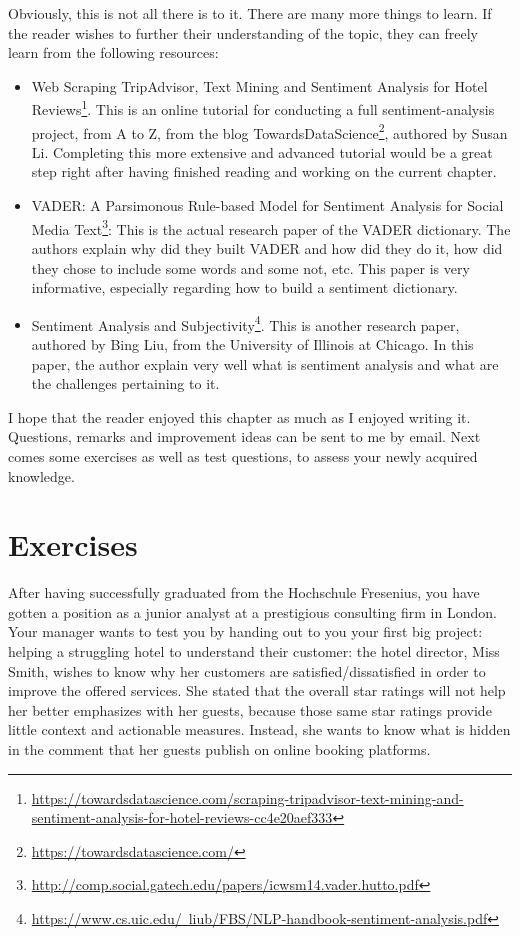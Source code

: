 	Obviously, this is not all there is to it. There are many more things to learn. If the reader wishes to further their understanding of the topic, they can freely learn from the following resources:
	\begin{itemize}
		\item Web Scraping TripAdvisor, Text Mining and Sentiment Analysis for Hotel Reviews\footnote{\href{https://towardsdatascience.com/scraping-tripadvisor-text-mining-and-sentiment-analysis-for-hotel-reviews-cc4e20aef333}{https://towardsdatascience.com/scraping-tripadvisor-text-mining-and-sentiment-analysis-for-hotel-reviews-cc4e20aef333}}. This is an online tutorial for conducting a full sentiment-analysis project, from A to Z, from the blog TowardsDataScience\footnote{\href{https://towardsdatascience.com/}{https://towardsdatascience.com/}}, authored by Susan Li. Completing this more extensive and advanced tutorial would be a great step right after having finished reading and working on the current chapter.
		\item VADER: A Parsimonous Rule-based Model for Sentiment Analysis for Social Media Text\footnote{\href{http://comp.social.gatech.edu/papers/icwsm14.vader.hutto.pdf}{http://comp.social.gatech.edu/papers/icwsm14.vader.hutto.pdf}}: This is the actual research paper of the VADER dictionary. The authors explain why did they built VADER and how did they do it, how did they chose to include some words and some not, etc. This paper is very informative, especially regarding how to build a sentiment dictionary.
		\item Sentiment Analysis and Subjectivity\footnote{\href{https://www.cs.uic.edu/~liub/FBS/NLP-handbook-sentiment-analysis.pdf}{https://www.cs.uic.edu/~liub/FBS/NLP-handbook-sentiment-analysis.pdf}}. This is another research paper, authored by Bing Liu, from the University of Illinois at Chicago. In this paper, the author explain very well what is sentiment analysis and what are the challenges pertaining to it.
	\end{itemize}

	I hope that the reader enjoyed this chapter as much as I enjoyed writing it. Questions, remarks and improvement ideas can be sent to me by email. Next comes some exercises as well as test questions, to assess your newly acquired knowledge.

	\section{Exercises}
	After having successfully graduated from the Hochschule Fresenius, you have gotten a position as a junior analyst at a prestigious consulting firm in London. Your manager wants to test you by handing out to you your first big project: helping a struggling hotel to understand their customer: the hotel director, Miss Smith, wishes to know why her customers are satisfied/dissatisfied in order to improve the offered services. She stated that the overall star ratings will not help her better emphasizes with her guests, because those same star ratings provide little context and actionable measures. Instead, she wants to know what is hidden in the comment that her guests publish on online booking platforms. 
	
